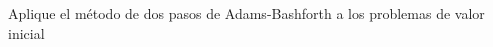 \begin{questions}
    \question


    Aplique el método de dos pasos de Adams-Bashforth a los problemas de valor inicial

    \begin{multicols}{3}

\end{multicols}
\end{questions}
